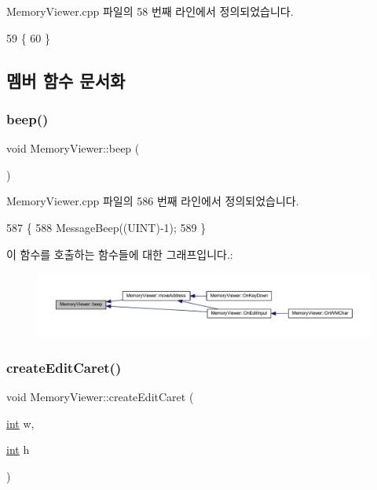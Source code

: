 Memory\+Viewer.\+cpp 파일의 58 번째 라인에서 정의되었습니다.


\begin{DoxyCode}
59 \{
60 \}
\end{DoxyCode}


\subsection{멤버 함수 문서화}
\mbox{\label{class_memory_viewer_a32096a7542505dd4c2b94b9a1f715ae9}} 
\subsubsection{\texorpdfstring{beep()}{beep()}}
{\footnotesize\ttfamily void Memory\+Viewer\+::beep (\begin{DoxyParamCaption}{ }\end{DoxyParamCaption})}



Memory\+Viewer.\+cpp 파일의 586 번째 라인에서 정의되었습니다.


\begin{DoxyCode}
587 \{
588   MessageBeep((UINT)-1);
589 \}
\end{DoxyCode}
이 함수를 호출하는 함수들에 대한 그래프입니다.\+:
\nopagebreak
\begin{figure}[H]
\begin{center}
\leavevmode
\includegraphics[width=350pt]{class_memory_viewer_a32096a7542505dd4c2b94b9a1f715ae9_icgraph}
\end{center}
\end{figure}
\mbox{\label{class_memory_viewer_a73ddaf427846eedb7073ad6fc69001ac}} 
\subsubsection{\texorpdfstring{create\+Edit\+Caret()}{createEditCaret()}}
{\footnotesize\ttfamily void Memory\+Viewer\+::create\+Edit\+Caret (\begin{DoxyParamCaption}\item[{\mbox{\hyperlink{_util_8cpp_a0ef32aa8672df19503a49fab2d0c8071}{int}}}]{w,  }\item[{\mbox{\hyperlink{_util_8cpp_a0ef32aa8672df19503a49fab2d0c8071}{int}}}]{h }\end{DoxyParamCaption})}



